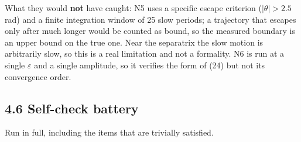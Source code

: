 \documentclass[11pt,a4paper]{article}
\begin{document}
What they would \textbf{not} have caught: N5 uses a specific escape criterion
(\(|\theta|>2.5\) rad) and a finite integration window of 25 slow periods; a
trajectory that escapes only after much longer would be counted as bound, so the
measured boundary is an upper bound on the true one. Near the separatrix the
slow motion is arbitrarily slow, so this is a real limitation and not a
formality. N6 is run at a single \(\varepsilon\) and a single amplitude, so it
verifies the form of (24) but not its convergence order.

\hypertarget{self-check-battery}{%
\subsection{4.6 Self-check battery}\label{self-check-battery}}

Run in full, including the items that are trivially satisfied.
\end{document}
